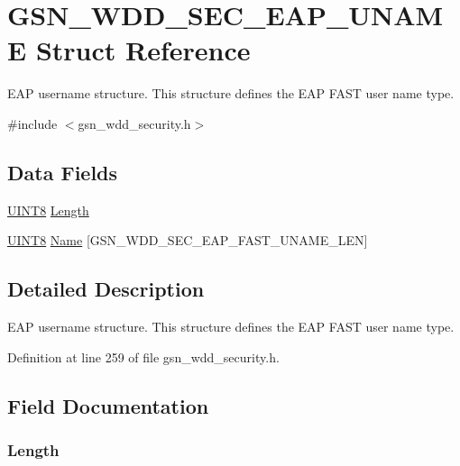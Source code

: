 \hypertarget{a00290}{
\section{GSN\_\-WDD\_\-SEC\_\-EAP\_\-UNAME Struct Reference}
\label{a00290}
}


EAP username structure. This structure defines the EAP FAST user name type.  




{\ttfamily \#include $<$gsn\_\-wdd\_\-security.h$>$}

\subsection*{Data Fields}
\begin{DoxyCompactItemize}
\item 
\hyperlink{a00660_gab27e9918b538ce9d8ca692479b375b6a}{UINT8} \hyperlink{a00290_a92c9c711d62ad0b99ad1f6c2a94f7bc2}{Length}
\item 
\hyperlink{a00660_gab27e9918b538ce9d8ca692479b375b6a}{UINT8} \hyperlink{a00290_afca8d8cf402048dcd824e474cea9dffa}{Name} \mbox{[}GSN\_\-WDD\_\-SEC\_\-EAP\_\-FAST\_\-UNAME\_\-LEN\mbox{]}
\end{DoxyCompactItemize}


\subsection{Detailed Description}
EAP username structure. This structure defines the EAP FAST user name type. 

Definition at line 259 of file gsn\_\-wdd\_\-security.h.



\subsection{Field Documentation}
\hypertarget{a00290_a92c9c711d62ad0b99ad1f6c2a94f7bc2}{
\subsubsection[{Length}]{ {\bf Length}}}
\label{a00290_a92c9c711d62ad0b99ad1f6c2a94f7bc2}


